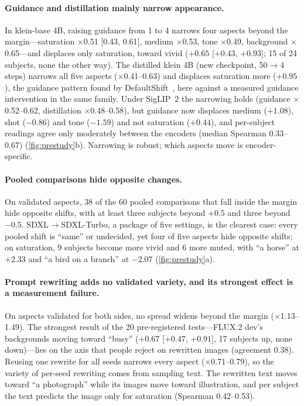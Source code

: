 \documentclass[review]{vgtc}                 %
\begin{document}
\paragraph{Guidance and distillation mainly narrow appearance.}
In klein-base 4B, raising guidance from 1 to 4 narrows four aspects beyond the margin---saturation $\times$0.51 [0.43, 0.61], medium $\times$0.53, tone $\times$0.49, background $\times$0.65---and displaces only saturation, toward vivid ($+0.65$ [$+0.43$, $+0.93]$; 15 of 24 subjects, none the other way). The distilled klein 4B (new checkpoint, 50$\rightarrow$4 steps) narrows all five aspects ($\times$0.41--0.63) and displaces saturation more ($+0.95$), the guidance pattern found by DefaultShift~\cite{defaultshift}, here against a measured guidance intervention in the same family. Under SigLIP~2 the narrowing holds (guidance $\times$0.52--0.62, distillation $\times$0.48--0.58), but guidance now displaces medium ($+1.08$), shot ($-0.86$) and tone ($-1.59$) and not saturation ($+0.44$), and per-subject readings agree only moderately between the encoders (median Spearman 0.33--0.67) (\cref{fig:prestudy}b). Narrowing is robust; which aspects move is encoder-specific.

\paragraph{Pooled comparisons hide opposite changes.}
On validated aspects, 38 of the 60 pooled comparisons that fall inside the margin hide opposite shifts, with at least three subjects beyond $+0.5$ and three beyond $-0.5$. SDXL$\rightarrow$SDXL-Turbo, a package of five settings, is the clearest case: every pooled shift is ``same'' or undecided, yet four of five aspects hide opposite shifts; on saturation, 9 subjects become more vivid and 6 more muted, with ``a horse'' at $+2.33$ and ``a bird on a branch'' at $-2.07$ (\cref{fig:prestudy}a).

\paragraph{Prompt rewriting adds no validated variety, and its strongest effect is a measurement failure.}
On aspects validated for both sides, no spread widens beyond the margin ($\times$1.13--1.49). The strongest result of the 20 pre-registered tests---FLUX.2 dev's backgrounds moving toward ``busy'' ($+0.67$ [$+0.47$, $+0.91$], 17 subjects up, none down)---lies on the axis that people reject on rewritten images (agreement 0.38). Reusing one rewrite for all seeds narrows every aspect ($\times$0.71--0.79), so the variety of per-seed rewriting comes from sampling text. The rewritten text moves toward ``a photograph'' while its images move toward illustration, and per subject the text predicts the image only for saturation (Spearman 0.42--0.53).
\end{document}
